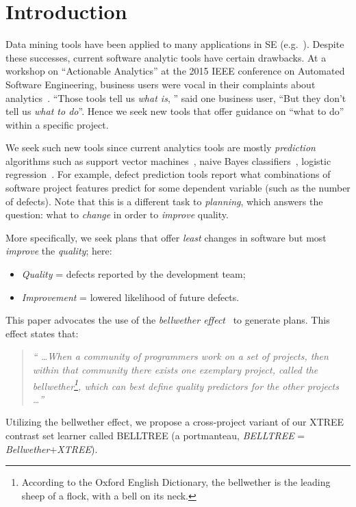 \documentclass[smallextended]{svjour3}       %
\newcommand{\bi}{\begin{itemize}} %
\newcommand{\ei}{\end{itemize}}
\begin{document}
\section{Introduction}
Data mining tools have been applied to many applications in SE (e.g.~\cite{czer11, ostrand04, Menzies2007a, turhan11, koc11b, export:208800, theisen15}). 
Despite these successes,  current
software analytic tools have certain drawbacks. At a workshop on ``Actionable Analytics'' at the 2015 IEEE conference on
Automated Software Engineering, 
business users were vocal in their complaints about analytics~\cite{hihn15}.
``Those tools tell us \textit{what is}, '' said one business user, ``But they don't tell us \textit{what to do}''.
Hence we seek new tools that offer  guidance on ``what to do'' within a specific project. 

We seek such new tools since  current   analytics tools are mostly \textit{prediction} algorithms such as support vector machines~\cite{cortes95}, naive Bayes classifiers~\cite{lessmann08}, logistic regression~\cite{lessmann08}. For example, defect prediction tools report what combinations of software project features predict for some dependent variable (such as the number of defects). Note that this is a different task to \textit{planning}, which answers the question: what to {\em change} in order to {\em improve} quality.
	
More specifically, we seek plans that offer {\em least} changes in software but most \textit{improve} the \textit{quality}; here:
\bi
\item \textit{Quality} = defects reported by the development team; 
\item \textit{Improvement} = lowered likelihood of future defects.
\ei
This paper advocates the use of the {\em bellwether effect}~\cite{krishna16, krishna17a, mensah2018investigating} to generate plans. This effect states that:
\begin{quote}
  \textit{`` \ldots When a community of programmers work on a set of projects, then within that community there exists one exemplary project, called the bellwether\footnote{According to the Oxford English Dictionary, the bellwether is the leading sheep of a flock, with a bell on its neck.}, which can best define quality predictors for the other projects \ldots ''}
\end{quote}
Utilizing the bellwether effect, we propose a cross-project variant of our XTREE contrast set learner called BELLTREE (a portmanteau,  \textit{BELLTREE} = \textit{Bellwether}$+$\textit{XTREE}). 
\end{document}
